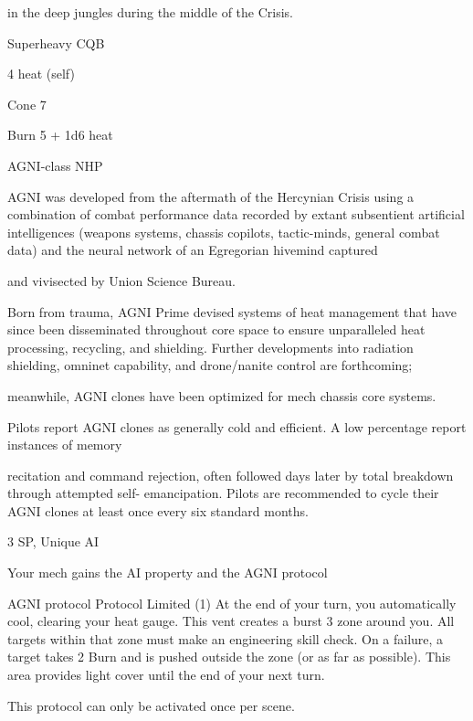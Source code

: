 in the deep jungles during the middle of the Crisis.

Superheavy CQB

4 heat (self)

Cone 7

Burn 5 + 1d6 heat


AGNI-class NHP

AGNI was developed from the aftermath of the Hercynian Crisis using a combination of combat
performance data recorded by extant subsentient artificial intelligences (weapons systems, chassis
copilots, tactic-minds, general combat data) and the neural network of an Egregorian hivemind captured

and vivisected by Union Science Bureau.




Born from trauma, AGNI Prime devised systems of heat management that have since been disseminated
throughout core space to ensure unparalleled heat processing, recycling, and shielding. Further
developments into radiation shielding, omninet capability, and drone/nanite control are forthcoming;

meanwhile, AGNI clones have been optimized for mech chassis core systems.

Pilots report AGNI clones as generally cold and efficient. A low percentage report instances of memory

recitation and command rejection, often followed days later by total breakdown through attempted self-
emancipation. Pilots are recommended to cycle their AGNI clones at least once every six standard months.

3 SP, Unique
AI

Your mech gains the AI property and the AGNI protocol

         AGNI protocol
	        Protocol
         Limited (1)
         At the end of your turn, you automatically cool, clearing your heat gauge. This vent
         creates a burst 3 zone around you. All targets within that zone must make an engineering
         skill check. On a failure, a target takes 2 Burn and is pushed outside the zone (or as far as
         possible). This area provides light cover until the end of your next turn.

         This protocol can only be activated once per scene.
